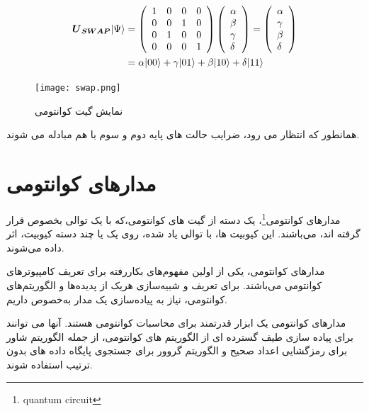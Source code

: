 \documentclass{book}
\begin{document}
\begin{center}
	$$\begin{aligned}
		\boldsymbol{U}_{\boldsymbol{SWAP}}|\Psi\rangle & =\left(\begin{array}{llll}
			1 & 0 & 0 & 0 \\
			0 & 0 & 1 & 0 \\
			0 & 1 & 0 & 0 \\
			0 & 0 & 0 & 1
		\end{array}\right)\left(\begin{array}{l}
			\alpha \\
			\beta \\
			\gamma \\
			\delta
		\end{array}\right)=\left(\begin{array}{l}
			\alpha \\
			\gamma \\
			\beta \\
			\delta
		\end{array}\right) \\
		\vspace{2cm}
		& =\alpha|00\rangle+\gamma|01\rangle+\beta|10\rangle+\delta|11\rangle
	\end{aligned}$$
\end{center}





\begin{figure}[ht]
	\centering
	\texttt{[image: swap.png]}
	\caption{ نمایش گیت کوانتومی }
	\label{SWAP}
\end{figure}



همانطور که انتظار می رود، ضرایب حالت های پایه دوم و سوم با هم مبادله می شوند.
\newpage
\section{مدار‌های کوانتومی}
مدار‌های ‌کوانتومی\footnote{quantum circuit}، یک دسته از گیت ها‌ی کوانتومی،که با یک توالی بخصوص قرار گرفته اند، ‌می‌باشند. این کیوبیت ها، با توالی یاد شده، روی یک یا چند دسته کیوبیت، اثر داده ‌می‌شوند. 

مدار‌های کوانتومی، یکی از اولین مفهوم‌های بکار‌رفته برای تعریف کامپیوتر‌های کوانتومی‌ می‌باشند. برای تعریف و شبیه‌سازی هریک از پدیده‌ها و الگوریتم‌های کوانتومی، نیاز به پیاده‌سازی یک مدار به‌خصوص داریم.


مدارهای کوانتومی یک ابزار قدرتمند برای محاسبات کوانتومی هستند. آنها می توانند برای پیاده سازی طیف گسترده ای از الگوریتم های کوانتومی، از جمله الگوریتم شاور برای رمزگشایی اعداد صحیح و الگوریتم گروور برای جستجوی پایگاه داده های بدون ترتیب استفاده شوند.
\end{document}
